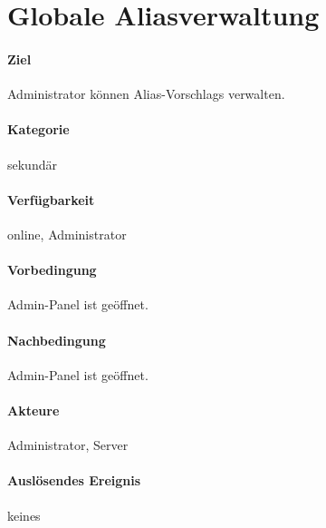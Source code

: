 \section{Globale Aliasverwaltung}
\label{Aliasverwaltungsfunktion}
\paragraph{Ziel}
\Gls{Administrator} können \Glspl{Alias-Vorschlag} verwalten.
\paragraph{Kategorie}
sekundär
\paragraph{Verfügbarkeit}
online, \Gls{Administrator}
\paragraph{Vorbedingung}
\Gls{Admin-Panel} ist geöffnet.
\paragraph{Nachbedingung}
\Gls{Admin-Panel} ist geöffnet.
\paragraph{Akteure}
\Gls{Administrator}, \Gls{Server}
\paragraph{Auslösendes Ereignis}
keines
